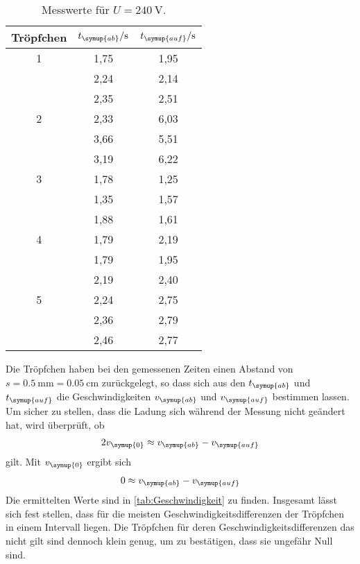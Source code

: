 \begin{table}
  \centering
  \caption{Messwerte für $U=\SI{240}{\volt}$.}
  \label{tab:t5}
  \begin{tabular}{c c c}
    \toprule
    Tröpfchen & $t_{\symup{ab}}/\unit{\second}$ & $t_{\symup{auf}}/\unit{\second}$ \\
    \midrule
    1 & 1,75 & 1,95 \\
      & 2,24 & 2,14 \\
      & 2,35 & 2,51 \\
    2 & 2,33 & 6,03 \\
      & 3,66 & 5,51 \\
      & 3,19 & 6,22 \\
    3 & 1,78 & 1,25 \\
      & 1,35 & 1,57 \\
      & 1,88 & 1,61 \\
    4 & 1,79 & 2,19 \\
      & 1,79 & 1,95 \\
      & 2,19 & 2,40 \\
    5 & 2,24 & 2,75 \\
      & 2,36 & 2,79 \\
      & 2,46 & 2,77 \\
    \bottomrule
  \end{tabular}
\end{table}
Die Tröpfchen haben bei den gemessenen Zeiten einen Abstand von $s=\SI{0,5}{\milli\meter} = \SI{0,05}{\centi\meter}$
zurückgelegt, so dass sich aus den $t_{\symup{ab}}$ und $t_{\symup{auf}}$ die Geschwindigkeiten $v_{\symup{ab}}$ und
$v_{\symup{auf}}$ bestimmen lassen. Um sicher zu stellen, dass die Ladung sich während der Messung nicht
geändert hat, wird überprüft, ob
\begin{align*}
  2v_{\symup{0}} \approx v_{\symup{ab}} - v_{\symup{auf}}
\end{align*}
gilt. Mit $v_{\symup{0}}$ ergibt sich
\begin{align*}
  0 \approx v_{\symup{ab}} - v_{\symup{auf}}
\end{align*}
Die ermittelten Werte sind in \autoref{tab:Geschwindigkeit} zu finden. Insgesamt lässt sich fest stellen, dass
für die meisten Geschwindigkeitsdifferenzen der Tröpfchen in einem Intervall liegen. Die Tröpfchen für deren
Geschwindigkeitsdifferenzen das nicht gilt sind dennoch klein genug, um zu bestätigen, dass sie ungefähr Null sind.
